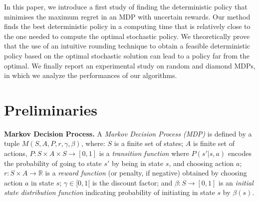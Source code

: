 \documentclass[runningheads,a4paper]{llncs}
\begin{document}
In this paper, we introduce a first study of finding the deterministic policy that minimises the maximum regret in an MDP with uncertain rewards. Our method finds the best deterministic policy in a computing time that is relatively close to the one needed to compute the optimal stochastic policy. 
We theoretically prove that the use of an intuitive rounding technique to obtain a feasible deterministic policy based on the optimal stochastic solution can lead to a policy far from the optimal. 
We finally report an experimental study on random and diamond MDPs, in which we analyze the performances of our algorithms. 








\section{Preliminaries}\label{sec:Preliminaries}

\textbf{Markov Decision Process.}  
A \textit{Markov Decision Process (MDP)} \citep{Puterman1994} is defined by a tuple $M(S, A, P, r, \gamma, \beta)$, where: $S$ is a finite set of states; $A$ is finite set of actions, $P: S \times A \times S \longrightarrow [0,1]$ is a \textit{transition function} where $P(s'|s,a)$ encodes the probability of going to state $s'$ by being in state $s$, and choosing action $a$; $r: S \times A \longrightarrow \mathbb{R}$ is a \textit{reward function} (or penalty, if negative) obtained by choosing action $a$ in state $s$; $\gamma \in [0, 1[$ is the discount factor; and $\beta: S \longrightarrow [0,1]$ is an \textit{initial state distribution function} indicating probability of initiating in state $s$ by $\beta(s)$.
\end{document}
